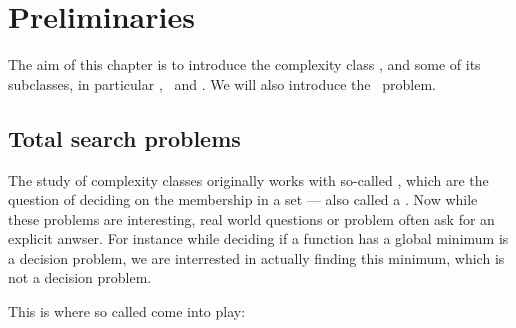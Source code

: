 \setchapterpreamble[u]{\margintoc}
\chapter{Preliminaries}

The aim of this chapter is to introduce the complexity class \TFNP, and some of its subclasses, in particular \PPAD, \PLS\ and \EOPL.
We will also introduce the \Tarski\ problem.

\section{Total search problems}

The study of complexity classes originally works with so-called , which are the question of deciding on the membership in a set ---
also called a .
Now while these problems are interesting, real world questions or problem often ask for an explicit anwser.
For instance while deciding if a function has a global minimum is a decision problem, we are interrested in actually finding this minimum, which is not a
decision problem.
\par
This is where so called  come into play:

